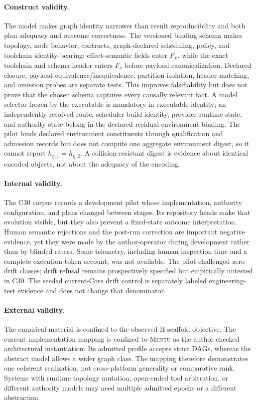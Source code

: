 \documentclass[11pt]{article}
\newcommand{\mentu}{\textsc{Mentu}}
\begin{document}
\paragraph{Construct validity.}
The model makes graph identity narrower than result reproducibility and
both plan adequacy and outcome correctness. The versioned binding schema makes
topology, node behavior, contracts, graph-declared scheduling, policy, and
toolchain identity-bearing: effect-semantic fields enter \(F_\chi\), while the
exact toolchain and schema header enters \(F_\nu\) before payload
canonicalization. Declared closure, payload equivalence/inequivalence,
partition isolation, header matching, and omission probes are separate tests.
This improves falsifiability but does not prove that the chosen schema captures
every causally relevant fact. A model selector frozen by the executable is
mandatory in executable identity; an independently resolved route,
scheduler-build identity, provider runtime state, and authority state belong in
the declared residual environment binding. The pilot binds declared
environment constituents through qualification and admission records but does
not compute one aggregate environment digest, so it cannot report
\(h_{\eta,1}=h_{\eta,2}\).  A collision-resistant digest is evidence about
identical encoded objects, not about the adequacy of the encoding.

\paragraph{Internal validity.}
The C30 corpus records a development pilot whose implementation, authority
configuration, and plans changed between stages.  Its \DistinctDiscoveryHeads{}
repository heads make that evolution visible, but they also prevent a
fixed-state outcome interpretation.  Human semantic rejections and the
post-run correction are important negative evidence, yet they were made by
the author-operator during development rather than by blinded raters. Some
telemetry, including human inspection time and a complete execution-token
account, was not available.  The pilot challenged zero drift classes; drift
refusal remains prospectively specified but empirically untested in C30. The
seeded current-Core drift control is separately labeled engineering-test
evidence and does not change that denominator.

\paragraph{External validity.}
The empirical material is confined to the observed H-scaffold objective. The
current implementation mapping is confined to \mentu{} as the author-checked
architectural instantiation. Its admitted profile accepts strict DAGs, whereas the
abstract model allows a wider graph class. The mapping therefore demonstrates
one coherent realization, not cross-platform generality or comparative rank.
Systems with runtime topology mutation, open-ended tool arbitration, or
different authority models may need multiple admitted epochs or a different
abstraction.
\end{document}
